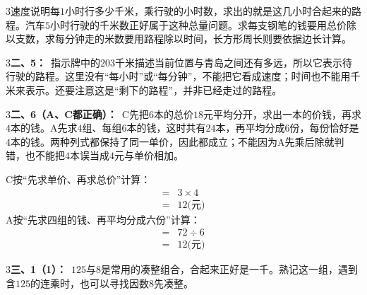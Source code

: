 \documentclass[multi=snippet,border={5bp 20bp 5bp 5bp}]{standalone}
\newenvironment{snippet}[3]{\begin{minipage}{#1bp}\color{answerred}\fontsize{#2}{#3}\selectfont\raggedright}{\end{minipage}}
\begin{document}
\begin{snippet}{505}{11.5}{14}\begin{multicols}{3}\raggedcolumns 速度说明每\(1\)\allowbreak 小时行多少千米，乘行驶的小时数，求出的就是这几小时合起来的路程。汽车\(5\)\allowbreak 小时行驶的千米数正好属于这种总量问题。求每支钢笔的钱要用总价除以支数，求每分钟走的米数要用路程除以时间，长方形周长则要依据边长计算。\end{multicols}\end{snippet}
\begin{snippet}{505}{11.5}{14}\begin{multicols}{3}\raggedcolumns \textbf{二、5：}\ 指示牌中的\(203\)\allowbreak 千米描述当前位置与青岛之间还有多远，所以它表示待行驶的路程。这里没有“每小时”或“每分钟”，不能把它看成速度；时间也不能用千米来表示。还要注意这是“剩下的路程”，并非已经走过的路程。\end{multicols}\end{snippet}
\begin{snippet}{505}{11.5}{14}\begin{multicols}{3}\raggedcolumns \textbf{二、6（A、C都正确）：}\ C先把\(6\)\allowbreak 本的总价\(18\)\allowbreak 元平均分开，求出一本的价钱，再求\(4\)\allowbreak 本的钱。A先求\(4\)\allowbreak 组、每组\(6\)\allowbreak 本的钱，这时共有\(24\)\allowbreak 本，再平均分成\(6\)\allowbreak 份，每份恰好是\(4\)\allowbreak 本的钱。两种列式都保持了同一单价，因此都成立；不能因为A先乘后除就判错，也不能把\(4\)\allowbreak 本误当成\(4\)\allowbreak 元与单价相加。\par C按“先求单价、再求总价”计算：\[\begin{aligned}={}&3\times4\\={}&12\text{(元)}\end{aligned}\]A按“先求四组的钱、再平均分成六份”计算：\[\begin{aligned}={}&72\div6\\={}&12\text{(元)}\end{aligned}\]\end{multicols}\end{snippet}
\begin{snippet}{505}{11.5}{14}\begin{multicols}{3}\raggedcolumns \textbf{三、1（1）：}\ \(125\)\allowbreak 与\(8\)\allowbreak 是常用的凑整组合，合起来正好是一千。熟记这一组，遇到含\(125\)\allowbreak 的连乘时，也可以寻找因数\(8\)\allowbreak 先凑整。\end{multicols}\end{snippet}
\end{document}
